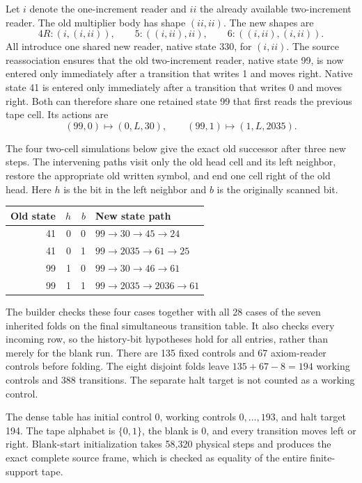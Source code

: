 \documentclass[11pt]{article}
\begin{document}
Let $i$ denote the one-increment reader and $ii$ the already available
two-increment reader.  The old multiplier body has shape $(ii,ii)$.
The new shapes are
\[
 4R:(i,(i,ii)),\qquad 5:((i,ii),ii),\qquad 6:((i,ii),(i,ii)).
\]
All introduce one shared new reader, native state 330, for $(i,ii)$.
The source reassociation ensures that the old two-increment reader,
native state 99, is now entered only immediately after a transition that
writes 1 and moves right.  Native state 41 is entered only immediately
after a transition that writes 0 and moves right.  Both can therefore
share one retained state 99 that first reads the previous tape cell.
Its actions are
\[
 (99,0)\mapsto(0,L,30),\qquad(99,1)\mapsto(1,L,2035).
\]

The four two-cell simulations below give the exact old successor after
three new steps.  The intervening paths visit only the old head cell and
its left neighbor, restore the appropriate old written symbol, and end
one cell right of the old head.  Here $h$ is the bit in the left neighbor
and $b$ is the originally scanned bit.

\begin{center}
\begin{tabular}{rrrl}
\toprule
Old state & $h$ & $b$ & New state path\\
\midrule
41 & 0 & 0 & $99\to30\to45\to24$\\
41 & 0 & 1 & $99\to2035\to61\to25$\\
99 & 1 & 0 & $99\to30\to46\to61$\\
99 & 1 & 1 & $99\to2035\to2036\to61$\\
\bottomrule
\end{tabular}
\end{center}

The builder checks these four cases together with all 28 cases of the
seven inherited folds on the final simultaneous transition table.  It
also checks every incoming row, so the history-bit hypotheses hold for
all entries, rather than merely for the blank run.  There are 135 fixed
controls and 67 axiom-reader controls before folding.  The eight
disjoint folds leave $135+67-8=194$ working controls and 388 transitions.
The separate halt target is not counted as a working control.

The dense table has initial control 0, working controls $0,\ldots,193$,
and halt target 194.  The tape alphabet is $\{0,1\}$, the blank is 0,
and every transition moves left or right.  Blank-start initialization
takes 58,320 physical steps and produces the exact complete source frame,
which is checked as equality of the entire finite-support tape.
\end{document}
